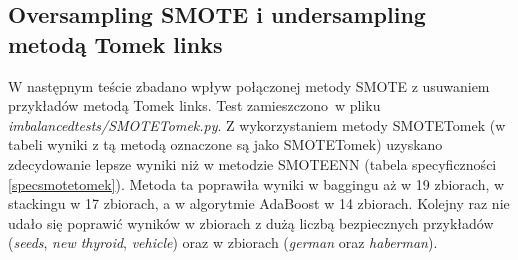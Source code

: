 \subsection{Oversampling SMOTE i undersampling metodą Tomek links}
W następnym teście zbadano wpływ połączonej metody SMOTE z usuwaniem przykładów metodą Tomek links. Test zamieszczono w pliku \textit{imbalancedtests/SMOTETomek.py}. Z wykorzystaniem metody SMOTETomek (w tabeli wyniki z tą metodą oznaczone są jako SMOTETomek) uzyskano zdecydowanie lepsze wyniki niż w metodzie SMOTEENN (tabela specyficzności \ref{specsmotetomek}). Metoda ta poprawiła wyniki w baggingu aż w 19 zbiorach, w stackingu w 17 zbiorach, a w algorytmie AdaBoost w 14 zbiorach. Kolejny raz nie udało się poprawić wyników w zbiorach z dużą liczbą bezpiecznych przykładów (\textit{seeds}, \textit{new thyroid}, \textit{vehicle}) oraz w zbiorach (\textit{german} oraz \textit{haberman}).

